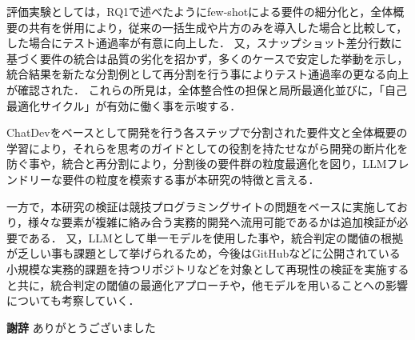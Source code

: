 \documentclass[submit,techrep,noauthor]{ipsj}
\begin{document}
評価実験としては，RQ1で述べたようにfew-shotによる要件の細分化と，全体概要の共有を併用により，従来の一括生成や片方のみを導入した場合と比較して，した場合にテスト通過率が有意に向上した．
又，スナップショット差分行数に基づく要件の統合は品質の劣化を招かず，多くのケースで安定した挙動を示し，統合結果を新たな分割例として再分割を行う事によりテスト通過率の更なる向上が確認された．
これらの所見は，全体整合性の担保と局所最適化並びに，「自己最適化サイクル」が有効に働く事を示唆する．

ChatDevをベースとして開発を行う各ステップで分割された要件文と全体概要の学習により，それらを思考のガイドとしての役割を持たせながら開発の断片化を防ぐ事や，統合と再分割により，分割後の要件群の粒度最適化を図り，LLMフレンドリーな要件の粒度を模索する事が本研究の特徴と言える．

一方で，本研究の検証は競技プログラミングサイトの問題をベースに実施しており，様々な要素が複雑に絡み合う実務的開発へ流用可能であるかは追加検証が必要である．
又，LLMとして単一モデルを使用した事や，統合判定の閾値の根拠が乏しい事も課題として挙げられるため，今後はGitHubなどに公開されている小規模な実務的課題を持つリポジトリなどを対象として再現性の検証を実施すると共に，統合判定の閾値の最適化アプローチや，他モデルを用いることへの影響についても考察していく．

\textbf{謝辞} ありがとうございました



\end{document}
